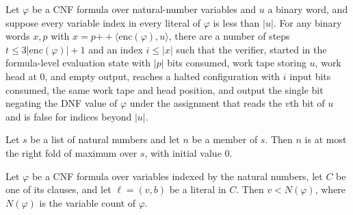 \begin{lemma}
\label{Complexity.taut_formula_run}
\leanok
{}
Let $\varphi$ be a CNF formula over natural-number variables and $u$ a binary word, and
suppose every variable index in every literal of $\varphi$ is less than $|u|$. For any
binary words $x,p$ with $x=p\mathbin{+\!\!+}\langle \mathrm{enc}(\varphi),u\rangle$,
there are a number of steps $t\le 3|\mathrm{enc}(\varphi)|+1$ and an index $i\le |x|$
such that the verifier, started in the formula-level evaluation state with $|p|$ bits
consumed, work tape storing $u$, work head at $0$, and empty output, reaches a halted
configuration with $i$ input bits consumed, the same work tape and head position, and
output the single bit negating the DNF value of $\varphi$ under the assignment that
reads the $v$th bit of $u$ and is false for indices beyond $|u|$.
\end{lemma}

\begin{lemma}
\label{Complexity.taut_le_max}
\leanok
{}
Let $s$ be a list of natural numbers and let $n$ be a member of $s$. Then $n$ is at most
the right fold of maximum over $s$, with initial value $0$.
\end{lemma}

\begin{lemma}
\label{Complexity.taut_literal_lt}
\leanok
{}
Let $\varphi$ be a CNF formula over variables indexed by the natural numbers, let $C$ be
one of its clauses, and let $\ell=(v,b)$ be a literal in $C$. Then $v<N(\varphi)$, where
$N(\varphi)$ is the variable count of $\varphi$.
\end{lemma}

